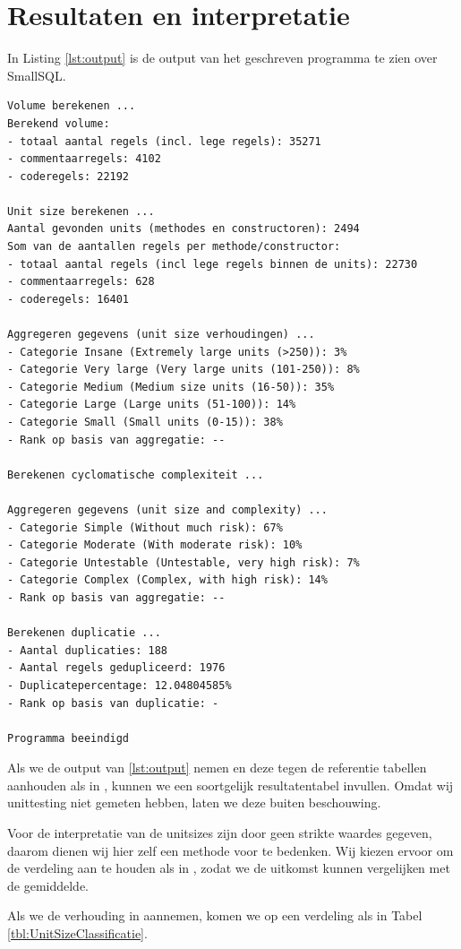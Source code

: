 \documentclass[a4paper]{article}
\begin{document}
\section{Resultaten en interpretatie}
In Listing \ref{lst:output} is de output van het geschreven programma te zien over SmallSQL. 

\begin{lstlisting}[caption={Programma output SmallSQL},label={lst:output},frame = single]
Volume berekenen ...
Berekend volume: 
- totaal aantal regels (incl. lege regels): 35271
- commentaarregels: 4102
- coderegels: 22192

Unit size berekenen ...
Aantal gevonden units (methodes en constructoren): 2494
Som van de aantallen regels per methode/constructor: 
- totaal aantal regels (incl lege regels binnen de units): 22730
- commentaarregels: 628
- coderegels: 16401

Aggregeren gegevens (unit size verhoudingen) ...
- Categorie Insane (Extremely large units (>250)): 3%
- Categorie Very large (Very large units (101-250)): 8%
- Categorie Medium (Medium size units (16-50)): 35%
- Categorie Large (Large units (51-100)): 14%
- Categorie Small (Small units (0-15)): 38%
- Rank op basis van aggregatie: --

Berekenen cyclomatische complexiteit ...

Aggregeren gegevens (unit size and complexity) ...
- Categorie Simple (Without much risk): 67%
- Categorie Moderate (With moderate risk): 10%
- Categorie Untestable (Untestable, very high risk): 7%
- Categorie Complex (Complex, with high risk): 14%
- Rank op basis van aggregatie: --

Berekenen duplicatie ...
- Aantal duplicaties: 188
- Aantal regels gedupliceerd: 1976
- Duplicatepercentage: 12.04804585%
- Rank op basis van duplicatie: -

Programma beeindigd
\end{lstlisting}
Als we de output van \ref{lst:output} nemen en deze tegen de referentie tabellen aanhouden als in \cite{A}, kunnen we een soortgelijk resultatentabel invullen. Omdat wij unittesting niet gemeten hebben, laten we deze buiten beschouwing.

Voor de interpretatie van de unitsizes zijn door \cite{A} geen strikte waardes gegeven, daarom dienen wij hier zelf een methode voor te bedenken.
Wij kiezen ervoor om de verdeling aan te houden als in \cite{B}, zodat we de uitkomst kunnen vergelijken met de gemiddelde.

Als we de verhouding in \cite{B} aannemen, komen we op een verdeling als in Tabel \ref{tbl:UnitSizeClassificatie}.
\end{document}
